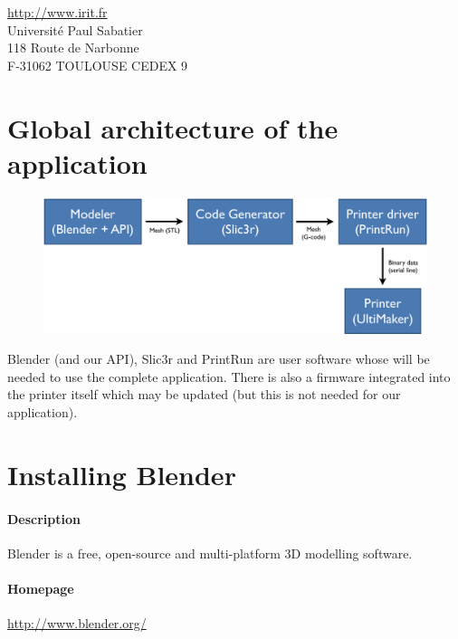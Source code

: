 \documentclass{article}
\begin{document}
\begin{center}
\url{http://www.irit.fr}\\
Université Paul Sabatier \\
118 Route de Narbonne \\
F-31062 TOULOUSE CEDEX 9
\end{center}

\thispagestyle{empty}

\newpage

\tableofcontents

\newpage

\section{Global architecture of the application}

\begin{figure}[!h]
\begin{center}
	\includegraphics[width=\textwidth]{schema}
\end{center}
\end{figure}

Blender (and our API), Slic3r and PrintRun are user software whose will be needed to use the complete application. There is also a firmware integrated into the printer itself which may be updated (but this is not needed for our application).

\newpage

\section{Installing Blender}

	\paragraph{Description} Blender is a free, open-source and multi-platform 3D modelling software.

	\paragraph{Homepage} \url{http://www.blender.org/}
\end{document}
